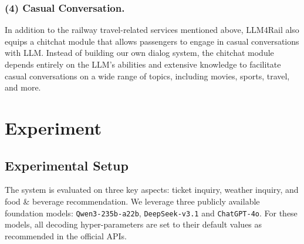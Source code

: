 \documentclass[runningheads]{llncs}
\begin{document}
\subsubsection{(4) Casual Conversation.}
In addition to the railway travel-related services mentioned above, LLM4Rail also equips a chitchat module that allows passengers to engage in casual conversations with LLM.
Instead of building our own dialog system, the chitchat module depends entirely on the LLM's abilities and extensive knowledge to facilitate casual conversations on a wide range of topics, including movies, sports, travel, and more.







\section{Experiment}

\subsection{Experimental Setup}

The system is evaluated on three key aspects: ticket inquiry, weather inquiry, and food \& beverage recommendation.
We leverage three publicly available foundation models: \verb|Qwen3-235b-a22b|, \verb|DeepSeek-v3.1| and \verb|ChatGPT-4o|. 
For these models, all decoding hyper-parameters are set to their default values as recommended in the official APIs.
\end{document}
